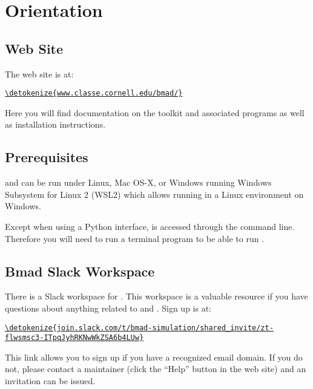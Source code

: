 \documentclass{hitec}     %
\newcommand{\Section}[1]{\section{#1}\vspace*{-1ex}}
\newenvironment{display}
  {\vspace*{-1.5ex} \begin{alltt}}
  {\end{alltt} \vspace*{-1.0ex}}
\begin{document}
\newpage

\Section{Orientation}
\label{s:orientation}

\subsection{Web Site}

The \bmad web site is at:
\begin{display}
  \url{\detokenize{www.classe.cornell.edu/bmad/}}
\end{display}
Here you will find documentation on the \bmad toolkit and associated programs as well as
installation instructions.

\subsection{Prerequisites}

\bmad and \tao can be run under Linux, Mac OS-X, or Windows running Windows Subsystem for Linux 2 (WSL2)
which allows running in a Linux environment on Windows.

Except when using a Python interface, \tao is accessed through the command line.  Therefore you will
need to run a terminal program to be able to run \tao.

\subsection{Bmad Slack Workspace}

There is a Slack workspace for \bmad. This workspace is a valuable resource if you have
questions about anything related to \bmad and \tao. Sign up is at:
\begin{display}
  \url{\detokenize{join.slack.com/t/bmad-simulation/shared_invite/zt-flwsmsc3-ITpqJyhRKNwWkZSA6b4LUw}}
\end{display}
This link allows you to sign up if you have a recognized email domain. If you do not, please contact
a \bmad maintainer (click the ``Help'' button in the \bmad web site) and an invitation can be
issued.

\end{document}
